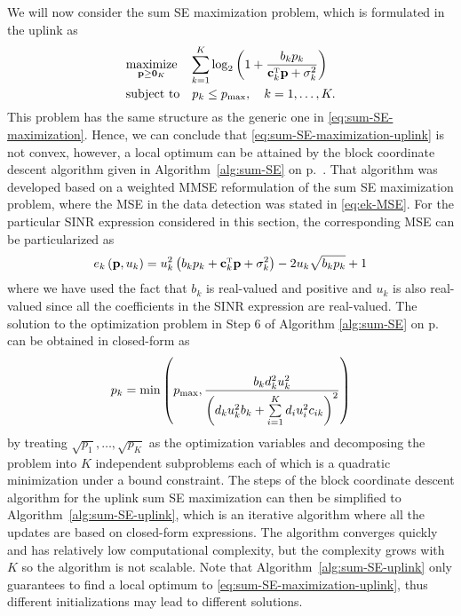 We will now consider the sum SE maximization problem, which is formulated in the uplink as
\begin{align} \label{eq:sum-SE-maximization-uplink}
&\underset{\vect{p} \geq \vect{0}_K}{\textrm{maximize}} \quad \sum\limits_{k=1}^K  \log_2\left(1+\frac{b_kp_k}{\vect{c}_k^{\Ttran}\vect{p}+\sigma_k^2}\right) \\
&\textrm{subject to} \quad p_k\leq \pmax, \quad k=1,\ldots,K . \nonumber
\end{align}
This problem has the same structure as the generic one in \eqref{eq:sum-SE-maximization}. Hence, we can conclude that \eqref{eq:sum-SE-maximization-uplink} is not convex, however, a local optimum can be attained by the block coordinate descent algorithm given in Algorithm~\ref{alg:sum-SE} on p.~\pageref{alg:sum-SE}.
That algorithm was developed based on a weighted MMSE reformulation of the sum SE maximization problem, where the MSE in the data detection was stated in \eqref{eq:ek-MSE}. For the particular SINR expression considered in this section, the corresponding MSE can be particularized as
\begin{align} 
e_k\left(\vect{p}, u_k\right)=u_{k}^2\left(b_kp_k+\vect{c}_k^{\Ttran}\vect{p}+\sigma_k^2\right) -2u_{k}\sqrt{b_kp_k}+1  \label{eq:ek-MSE-uplink}
\end{align}
where we have used the fact that $b_k$ is real-valued and positive and $u_k$ is also real-valued since all the coefficients in the SINR expression are real-valued.
The solution to the optimization problem in Step 6 of Algorithm \ref{alg:sum-SE} on p.~\pageref{alg:sum-SE} can be obtained in closed-form as
\begin{align} \label{eq:pk-update-uplink}
p_k=\min\left(p_{\textrm{max}}, \frac{b_kd_k^2u_k^2}{\left(d_ku_k^2b_k+\sum\limits_{i=1}^Kd_iu_i^2c_{ik}\right)^2}  \right)
\end{align}
by treating $\sqrt{p_1},\ldots,\sqrt{p_K}$ as the optimization variables and decomposing the problem into $K$ independent subproblems each of which is a quadratic minimization under a bound constraint. The steps of the block coordinate descent algorithm for the uplink sum SE maximization can then be simplified to Algorithm~\ref{alg:sum-SE-uplink}, which is an iterative algorithm where all the updates are based on closed-form expressions. 
The algorithm converges quickly and has relatively low computational complexity, but the complexity grows with $K$ so the algorithm is not scalable. Note that Algorithm~\ref{alg:sum-SE-uplink} only guarantees to find a local optimum to \eqref{eq:sum-SE-maximization-uplink}, thus different initializations may lead to different solutions.

